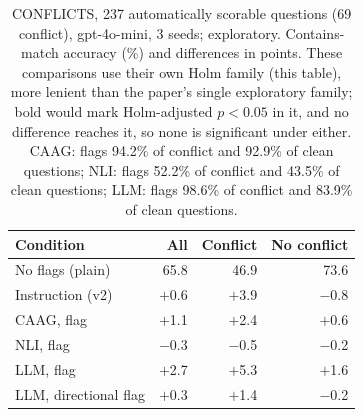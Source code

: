 \begin{table}[t]
\centering\small
\begin{tabular}{lrrr}
\toprule
Condition & All & Conflict & No conflict \\
\midrule
No flags (plain) & 65.8 & 46.9 & 73.6 \\
\midrule
Instruction (v2) & $+$0.6 & $+$3.9 & $-$0.8 \\
CAAG, flag & $+$1.1 & $+$2.4 & $+$0.6 \\
NLI, flag & $-$0.3 & $-$0.5 & $-$0.2 \\
LLM, flag & $+$2.7 & $+$5.3 & $+$1.6 \\
LLM, directional flag & $+$0.3 & $+$1.4 & $-$0.2 \\
\bottomrule
\end{tabular}
\caption{CONFLICTS, 237 automatically scorable questions (69 conflict), gpt-4o-mini, 3 seeds; exploratory.
Contains-match accuracy (\%) and differences in points. These comparisons use their own Holm family (this table),
more lenient than the paper's single exploratory family; bold would mark Holm-adjusted $p<0.05$ in it, and no difference
reaches it, so none is significant under either.
CAAG: flags 94.2\% of conflict and 92.9\% of clean questions; NLI: flags 52.2\% of conflict and 43.5\% of clean questions; LLM: flags 98.6\% of conflict and 83.9\% of clean questions.}
\label{tab:conflicts}
\end{table}
